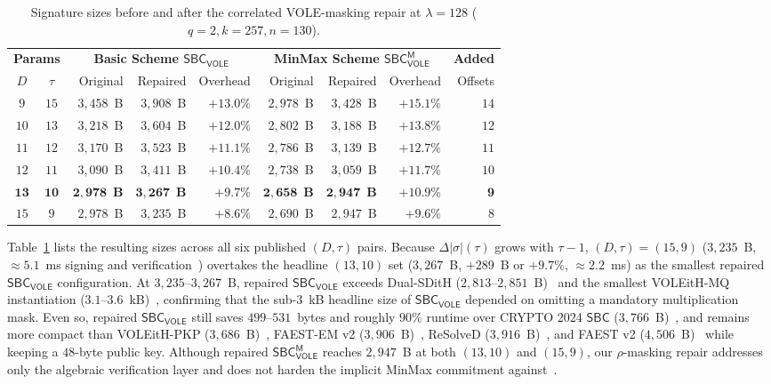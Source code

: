 \documentclass[11pt,a4paper]{article}
\theoremstyle{definition}
\theoremstyle{remark}
\newcommand{\SBC}{\mathsf{SBC}}
\newcommand{\SBCVOLE}{\mathsf{SBC}_{\mathsf{VOLE}}}
\newcommand{\SBCVOLEM}{\mathsf{SBC}_{\mathsf{VOLE}}^{\mathsf{M}}}
\begin{document}
\begin{table}[t]
\centering
\caption{Signature sizes before and after the correlated VOLE-masking repair at $\lambda = 128$ ($q = 2, k = 257, n = 130$).}
\label{tab:repair-sizes}
\small
\setlength{\tabcolsep}{4.5pt}
\begin{tabular}{@{}ccrrrrrrr@{}}
\toprule
\multicolumn{2}{c}{\textbf{Params}} & \multicolumn{3}{c}{\textbf{Basic Scheme $\SBCVOLE$}} & \multicolumn{3}{c}{\textbf{MinMax Scheme $\SBCVOLEM$}} & \textbf{Added} \\
\cmidrule(lr){1-2} \cmidrule(lr){3-5} \cmidrule(lr){6-8}
$D$ & $\tau$ & Original & Repaired & Overhead & Original & Repaired & Overhead & Offsets \\
\midrule
$9$  & $15$ & $3{,}458$~B & $3{,}908$~B & $+13.0\%$ & $2{,}978$~B & $3{,}428$~B & $+15.1\%$ & $14$ \\
$10$ & $13$ & $3{,}218$~B & $3{,}604$~B & $+12.0\%$ & $2{,}802$~B & $3{,}188$~B & $+13.8\%$ & $12$ \\
$11$ & $12$ & $3{,}170$~B & $3{,}523$~B & $+11.1\%$ & $2{,}786$~B & $3{,}139$~B & $+12.7\%$ & $11$ \\
$12$ & $11$ & $3{,}090$~B & $3{,}411$~B & $+10.4\%$ & $2{,}738$~B & $3{,}059$~B & $+11.7\%$ & $10$ \\
$\mathbf{13}$ & $\mathbf{10}$ & $\mathbf{2{,}978}$~\textbf{B} & $\mathbf{3{,}267}$~\textbf{B} & $\mathbf{+9.7\%}$ & $\mathbf{2{,}658}$~\textbf{B} & $\mathbf{2{,}947}$~\textbf{B} & $\mathbf{+10.9\%}$ & $\mathbf{9}$ \\
$15$ & $9$  & $2{,}978$~B & $3{,}235$~B & $+8.6\%$  & $2{,}690$~B & $2{,}947$~B & $+9.6\%$  & $8$ \\
\bottomrule
\end{tabular}
\end{table}

Table~\ref{tab:repair-sizes} lists the resulting sizes across all six published $(D, \tau)$ pairs. Because $\Delta|\sigma|(\tau)$ grows with $\tau - 1$, $(D, \tau) = (15, 9)$ ($3{,}235$~B, $\approx 5.1$~ms signing and verification~\cite{HJ25}) overtakes the headline $(13, 10)$ set ($3{,}267$~B, $+289$~B or $+9.7\%$, $\approx 2.2$~ms) as the smallest repaired $\SBCVOLE$ configuration. At $3{,}235$--$3{,}267$~B, repaired $\SBCVOLE$ exceeds Dual-SDitH ($2{,}813$--$2{,}851$~B)~\cite{BFGNR24} and the smallest VOLEitH-MQ instantiation ($3.1$--$3.6$~kB)~\cite{Bui24}, confirming that the sub-$3$~kB headline size of $\SBCVOLE$ depended on omitting a mandatory multiplication mask. Even so, repaired $\SBCVOLE$ still saves $499$--$531$~bytes and roughly $90\%$ runtime over CRYPTO 2024 $\SBC$ ($3{,}766$~B)~\cite{HJ24}, and remains more compact than VOLEitH-PKP ($3{,}686$~B)~\cite{BBGK24}, FAEST-EM v2 ($3{,}906$~B)~\cite{FAEST24}, ReSolveD ($3{,}916$~B)~\cite{CLYYYZ24}, and FAEST v2 ($4{,}506$~B)~\cite{FAEST24} while keeping a $48$-byte public key. Although repaired $\SBCVOLEM$ reaches $2{,}947$~B at both $(13, 10)$ and $(15, 9)$, our $\rho$-masking repair addresses only the algebraic verification layer and does not harden the implicit MinMax commitment against~\cite{KLS25}.
\end{document}
